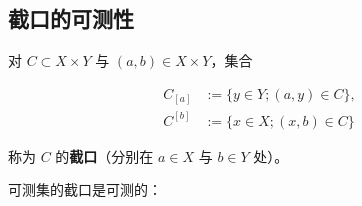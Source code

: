 \subsection*{截口的可测性}

对 $ C \subset X \times Y $ 与 $ (a, b) \in X \times Y $，集合

\begin{equation*}
\begin{aligned}
C_{[a]} &:= \{ y \in Y ; (a, y) \in C \} , \\ C^{[b]} &:= \{ x \in X ; (x, b) \in C \}
\end{aligned}
\end{equation*}

称为 $ C $ 的\textbf{截口}（分别在 $ a \in X $ 与 $ b \in Y $ 处）。


可测集的截口是可测的：

